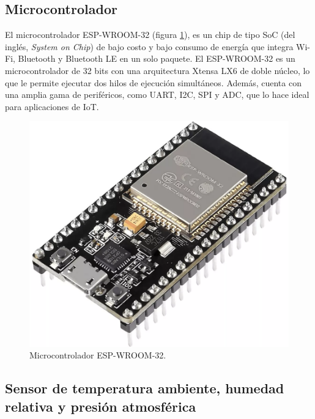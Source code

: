 
\subsection{Microcontrolador}\label{sec:microcontrolador}

El microcontrolador ESP-WROOM-32 (figura \ref{fig:ESP32}), es un chip de tipo
SoC (del inglés, \textit{System on Chip}) de bajo costo y bajo consumo de
energía que integra Wi-Fi, Bluetooth y Bluetooth LE en un solo paquete. El
ESP-WROOM-32 \cite{EspressifESP32WROOM} es un microcontrolador de 32 bits con
una arquitectura Xtensa LX6 de doble núcleo, lo que le permite ejecutar dos
hilos de ejecución simultáneos. Además, cuenta con una amplia gama de
periféricos, como UART, I2C, SPI y ADC, que lo hace ideal para aplicaciones de
IoT.

\begin{figure}[H]
	\centering
	\includegraphics[height=.15\textwidth]{./Images/3.png}
	\caption{Microcontrolador ESP-WROOM-32\protect\footnotemark.}
	\label{fig:ESP32}
\end{figure}


\subsection{Sensor de temperatura ambiente, humedad relativa y presión atmosférica}

